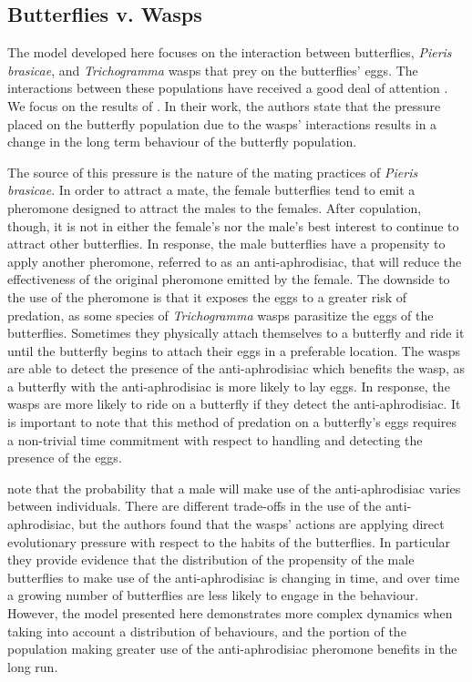 \documentclass[review,authoryear]{elsarticle}
\begin{document}
\subsection{Butterflies v. Wasps}
\label{butterflyVWasps}

The model developed here focuses on the interaction between butterflies,
\textit{Pieris brasicae}, and \textit{Trichogramma} wasps that prey on
the butterflies' eggs. The interactions between these populations have
received a good deal of attention
\citep{PMC2797620,doi:10.1111/j.1439-0418.1986.tb00834.x,Figueroa2010AttractionOT,10.3389/fpls.2019.01768}. We
focus on the results of \cite{10.1093/beheco/arq007}. In their work, the authors state
that the pressure placed on the butterfly population due to the wasps'
interactions results in a change in the long term behaviour of the
butterfly population.

The source of this pressure is the nature of the mating practices of
\textit{Pieris brasicae}. In order to attract a mate, the female
butterflies tend to emit a pheromone designed to attract the males to
the females. After copulation, though, it is not in either the
female's nor the male's best interest to continue to attract other
butterflies. In response, the male butterflies have a propensity to
apply another pheromone, referred to as an anti-aphrodisiac, that will
reduce the effectiveness of the original pheromone emitted by the
female.
The downside to the use of the pheromone is that it exposes the eggs
to a greater risk of predation, as some species of \textit{Trichogramma}
wasps parasitize the eggs of the butterflies. Sometimes they
physically attach themselves to a butterfly and ride it until the
butterfly begins to attach their eggs in a preferable location. The
wasps are able to detect the presence of the anti-aphrodisiac which benefits the wasp, as a butterfly with the
anti-aphrodisiac is more likely to lay eggs. In response, the wasps
are more likely to ride on a butterfly if they detect the
anti-aphrodisiac. It is important to note that this method of predation on
a butterfly's eggs requires a non-trivial time commitment with respect
to handling and detecting the presence of the eggs.

 \cite{10.1093/beheco/arq007} note that the probability that
a male will make use of the anti-aphrodisiac varies between
individuals. There are different trade-offs in the use of the
anti-aphrodisiac, but the authors found that the wasps' actions are
applying direct evolutionary pressure with respect to the habits of
the butterflies. In particular they provide evidence that the
distribution of the propensity of the male butterflies to make use of
the anti-aphrodisiac is changing in time, and over time a growing
number of butterflies are less likely to engage in the behaviour. However, the model presented here demonstrates more complex dynamics when taking into account a distribution of behaviours, and the portion of the population making greater use of the anti-aphrodisiac pheromone benefits in the long run.
\end{document}
